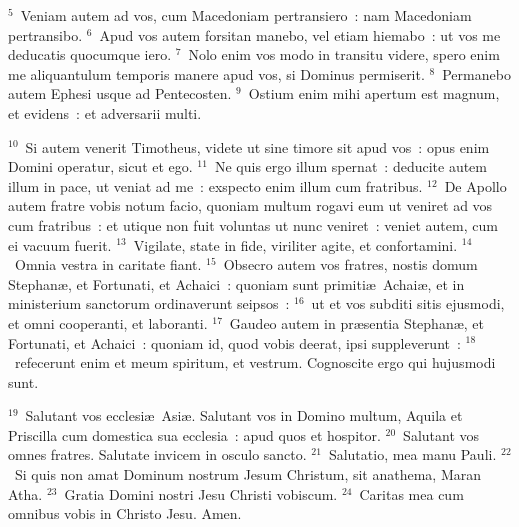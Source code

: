 ${}^{5}$~Veniam autem ad vos, cum Macedoniam pertransiero~: nam Macedoniam pertransibo.
${}^{6}$~Apud vos autem forsitan manebo, vel etiam hiemabo~: ut vos me deducatis quocumque iero.
${}^{7}$~Nolo enim vos modo in transitu videre, spero enim me aliquantulum temporis manere apud vos, si Dominus permiserit.
${}^{8}$~Permanebo autem Ephesi usque ad Pentecosten.
${}^{9}$~Ostium enim mihi apertum est magnum, et evidens~: et adversarii multi.


${}^{10}$~Si autem venerit Timotheus, videte ut sine timore sit apud vos~: opus enim Domini operatur, sicut et ego.
${}^{11}$~Ne quis ergo illum spernat~: deducite autem illum in pace, ut veniat ad me~: exspecto enim illum cum fratribus.
${}^{12}$~De Apollo autem fratre vobis notum facio, quoniam multum rogavi eum ut veniret ad vos cum fratribus~: et utique non fuit voluntas ut nunc veniret~: veniet autem, cum ei vacuum fuerit.
${}^{13}$~Vigilate, state in fide, viriliter agite, et confortamini.
${}^{14}$~Omnia vestra in caritate fiant.
${}^{15}$~Obsecro autem vos fratres, nostis domum Stephan\ae , et Fortunati, et Achaici~: quoniam sunt primiti\ae\ Achai\ae , et in ministerium sanctorum ordinaverunt seipsos~:
${}^{16}$~ut et vos subditi sitis ejusmodi, et omni cooperanti, et laboranti.
${}^{17}$~Gaudeo autem in pr\ae sentia Stephan\ae , et Fortunati, et Achaici~: quoniam id, quod vobis deerat, ipsi suppleverunt~:
${}^{18}$~refecerunt enim et meum spiritum, et vestrum. Cognoscite ergo qui hujusmodi sunt.


${}^{19}$~Salutant vos ecclesi\ae\ Asi\ae . Salutant vos in Domino multum, Aquila et Priscilla cum domestica sua ecclesia~: apud quos et hospitor.
${}^{20}$~Salutant vos omnes fratres. Salutate invicem in osculo sancto.
${}^{21}$~Salutatio, mea manu Pauli.
${}^{22}$~Si quis non amat Dominum nostrum Jesum Christum, sit anathema, Maran Atha.
${}^{23}$~Gratia Domini nostri Jesu Christi vobiscum.
${}^{24}$~Caritas mea cum omnibus vobis in Christo Jesu. Amen.
